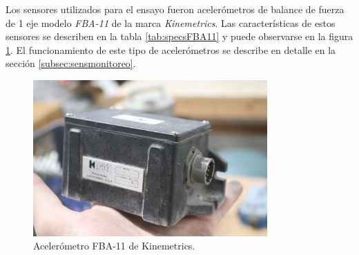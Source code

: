 Los sensores utilizados para el ensayo fueron acelerómetros de balance de fuerza de 1 eje modelo \textit{FBA-11} de la marca \textit{Kinemetrics}. Las características de estos sensores se describen en la tabla \ref{tab:specsFBA11} y puede observarse en la figura \ref{fig:FBA11}. El funcionamiento de este tipo de acelerómetros se describe en detalle en la sección \ref{subsec:sensmonitoreo}.


\begin{figure}[H]
    \centering
    \includegraphics[width = 0.8\textwidth]{imagenes/cap3_resultados/Ensayos/FBA11.jpg}
    \caption{Acelerómetro FBA-11 de Kinemetrics.}
    \label{fig:FBA11}
\end{figure}

\begin{table}[H]
    \centering
    \caption{Especificaciones del acelerómetro FBA-11 de Kinemetrics}
    \label{tab:specsFBA11}
    \end{table}

